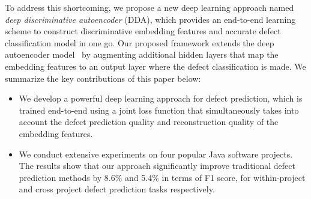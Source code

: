 To address this shortcoming, we propose a new deep learning approach named \emph{deep discriminative autoencoder} (DDA), which provides an end-to-end learning scheme to construct discriminative embedding features and accurate defect classification model in one go. Our proposed framework extends the deep autoencoder model~\cite{ng2011sparse} by augmenting additional hidden layers that map the embedding features to an output layer where the defect classification is made.
We summarize the key contributions of this paper below:
\begin{itemize}
	\item We develop a powerful deep learning approach for defect prediction, which is trained end-to-end using a joint loss function that simultaneously takes into account the defect prediction quality and reconstruction quality of the embedding features.
	\item We conduct extensive experiments on four popular Java software projects. The results show that our approach significantly improve traditional defect prediction methods by 8.6\% and 5.4\% in terms of F1 score, for within-project and cross project defect prediction tasks respectively. 
\end{itemize}


